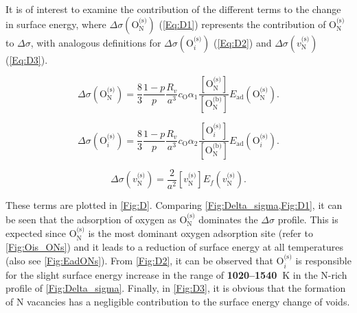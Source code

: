 \documentclass[preprint,12pt,sort&compress]{elsarticle}
\newcommand{\?}{\stackrel{?}{=}}
\providecommand{\DIFaddtex}[1]{{\bf #1}} %
\providecommand{\DIFdeltex}[1]{} %
\providecommand{\DIFaddbegin}{\protect\color{blue}} %
\providecommand{\DIFaddend}{\protect\color{black}} %
\providecommand{\DIFdelbegin}{\protect\color{red}} %
\providecommand{\DIFdelend}{\protect\color{black}} %
\providecommand{\DIFadd}[1]{\texorpdfstring{\DIFaddtex{#1}}{#1}} %
\providecommand{\DIFdel}[1]{\texorpdfstring{\DIFdeltex{#1}}{}} %
\begin{document}
It is of interest to examine the contribution of the different terms to the change in surface energy, where $\Delta \sigma ( \text{O}_\text{N}^\text{(s)} )$ (\cref{Eq:D1}) represents the contribution of $\text{O}_\text{N}^\text{(s)}$ to $\Delta \sigma$, with analogous definitions for $\Delta \sigma ( \text{O}_i^\text{(s)} )$ (\cref{Eq:D2}) and $\Delta \sigma ( v_\text{N}^\text{(s)} )$ (\cref{Eq:D3}). 

\begin{equation}
\Delta \sigma ( \text{O}_\text{N}^{\text{(s)}} ) = \frac{8}{3} \frac{1-p}{p} \frac{R_v}{a^3} c_\text{O} \alpha_1 \frac{ [ \text{O}_\text{N}^{\text{(s)}} ] }{ [ \text{O}_\text{N}^{\text{(b)}} ] }  E_\text{ad}( \text{O}_\text{N}^{\text{(s)}} ).
\label{Eq:D1}
\end{equation}

\begin{equation}
\Delta \sigma ( \text{O}_i^{\text{(s)}} ) = \frac{8}{3} \frac{1-p}{p} \frac{R_v}{a^3} c_\text{O} \alpha_2 \frac{ [ \text{O}_i^{\text{(s)}} ] }{ [ \text{O}_\text{N}^{\text{(b)}} ] }  E_\text{ad}( \text{O}_i^{\text{(s)}} ).
\label{Eq:D2}
\end{equation}

\begin{equation}
\Delta \sigma (v_\text{N}^{\text{(s)}}) = \frac{2}{a^2} [ v_\text{N}^{\text{(s)}} ] E_f ( v_\text{N}^{\text{(s)}} ).
\label{Eq:D3}
\end{equation}
\DIFdelbegin %

\DIFdelend \noindent These terms are plotted in \cref{Fig:D}. Comparing \cref{Fig:Delta_sigma,Fig:D1}, it can be seen that the adsorption of oxygen as $\text{O}_\text{N}^\text{(s)}$ dominates the $\Delta \sigma$ profile. This is expected since $\text{O}_\text{N}^\text{(s)}$ is the most dominant oxygen adsorption site (refer to \cref{Fig:Ois_ONs}) and it leads to a reduction of surface energy at all temperatures (also see \cref{Fig:EadONs}). From \cref{Fig:D2}, it can be observed that $\text{O}_i^\text{(s)}$ is responsible for the slight surface energy increase in the range of \DIFdelbegin \DIFdel{1020--1520 }\DIFdelend \DIFaddbegin \DIFadd{1020--1540~}\DIFaddend K in the N-rich profile of \cref{Fig:Delta_sigma}. Finally, in \cref{Fig:D3}, it is obvious that the formation of N vacancies has a negligible contribution to the surface energy change of voids.
\end{document}
